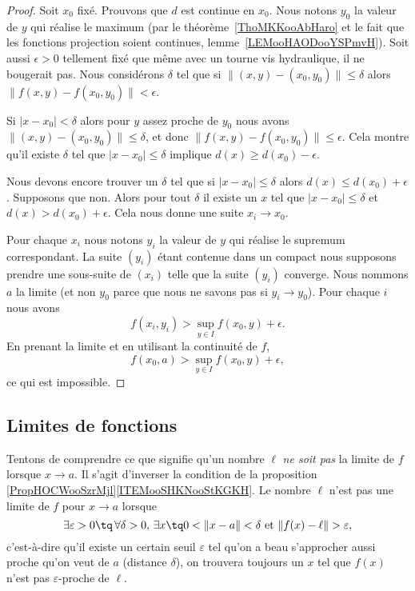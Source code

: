\begin{proof}
	Soit \( x_0\) fixé. Prouvons que \( d\) est continue en \( x_0\). Nous notons \( y_0\) la valeur de \( y\) qui réalise le maximum (par le théorème~\ref{ThoMKKooAbHaro} et le fait que les fonctions projection soient continues, lemme~\ref{LEMooHAODooYSPmvH}). Soit aussi \( \epsilon>0\) tellement fixé que même avec un tourne vis hydraulique, il ne bougerait pas. Nous considérons \( \delta\) tel que si \( \| (x,y)-(x_0,y_0) \|\leq \delta\) alors \( \| f(x,y)-f(x_0,y_0) \|<\epsilon\).

	Si \( | x-x_0 |<\delta\) alors pour \( y\) assez proche de \( y_0\) nous avons \( \| (x,y)-(x_0,y_0) \|\leq \delta\), et donc \( \| f(x,y)-f(x_0,y_0) \|\leq \epsilon \). Cela montre qu'il existe \( \delta\) tel que \( | x-x_0 |\leq \delta\) implique \( d(x)\geq d(x_0)-\epsilon\).

	Nous devons encore trouver un \( \delta\) tel que si \( | x-x_0 |\leq \delta\) alors \( d(x)\leq d(x_0)+\epsilon\). Supposons que non. Alors pour tout \( \delta\) il existe un \( x\) tel que \( | x-x_0 |\leq \delta\) et \( d(x)> d(x_0)+\epsilon\). Cela nous donne une suite \( x_i\to x_0\).

	Pour chaque \( x_i\) nous notons \( y_i\) la valeur de \( y\) qui réalise le supremum correspondant. La suite \( (y_i)\) étant contenue dans un compact nous supposons prendre une sous-suite de \( (x_i)\) telle que la suite \( (y_i)\) converge. Nous nommons \( a\) la limite (et non \( y_0\) parce que nous ne savons pas si \( y_i\to y_0\)). Pour chaque \( i\) nous avons
	\begin{equation}
		f(x_i,y_i)>\sup_{y\in I}f(x_0,y)+\epsilon.
	\end{equation}
	En prenant la limite et en utilisant la continuité de \( f\),
	\begin{equation}
		f(x_0,a)>\sup_{y\in I} f(x_0,y)+\epsilon,
	\end{equation}
	ce qui est impossible.
\end{proof}

\subsection{Limites de fonctions}

Tentons de comprendre ce que signifie qu'un nombre $\ell$ \emph{ne soit pas} la limite de $f$ lorsque $x\to a$. Il s'agit d'inverser la condition de la proposition \ref{PropHOCWooSzrMjl}\ref{ITEMooSHKNooStKGKH}. Le nombre $\ell$ n'est pas une limite de $f$ pour $x\to a$ lorsque
\begin{equation}		\label{EqCaractNonLim}
	\exists\varepsilon>0\tq\,\forall\delta>0,\,\exists x\tq 0<\| x-a \|<\delta\text{ et }\| f(x)-\ell \|>\varepsilon,
\end{equation}
c'est-à-dire qu'il existe un certain seuil $\varepsilon$ tel qu'on a beau s'approcher aussi proche qu'on veut de $a$ (distance $\delta$), on trouvera toujours un $x$ tel que $f(x)$ n'est pas $\varepsilon$-proche de $\ell$.

